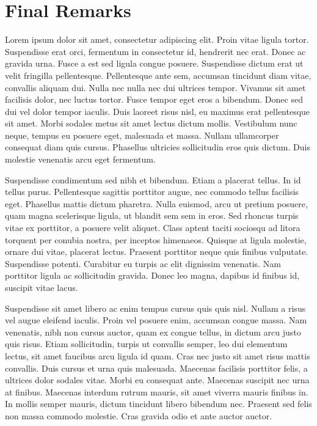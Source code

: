 
\section{Final Remarks}

 Lorem ipsum dolor sit amet, consectetur adipiscing elit. Proin vitae ligula tortor. Suspendisse erat orci, fermentum in consectetur id, hendrerit nec erat. Donec ac gravida urna. Fusce a est sed ligula congue posuere. Suspendisse dictum erat ut velit fringilla pellentesque. Pellentesque ante sem, accumsan tincidunt diam vitae, convallis aliquam dui. Nulla nec nulla nec dui ultrices tempor. Vivamus sit amet facilisis dolor, nec luctus tortor. Fusce tempor eget eros a bibendum. Donec sed dui vel dolor tempor iaculis. Duis laoreet risus nisl, eu maximus erat pellentesque sit amet. Morbi sodales metus sit amet lectus dictum mollis. Vestibulum nunc neque, tempus eu posuere eget, malesuada et massa. Nullam ullamcorper consequat diam quis cursus. Phasellus ultricies sollicitudin eros quis dictum. Duis molestie venenatis arcu eget fermentum.

Suspendisse condimentum sed nibh et bibendum. Etiam a placerat tellus. In id tellus purus. Pellentesque sagittis porttitor augue, nec commodo tellus facilisis eget. Phasellus mattis dictum pharetra. Nulla euismod, arcu ut pretium posuere, quam magna scelerisque ligula, ut blandit sem sem in eros. Sed rhoncus turpis vitae ex porttitor, a posuere velit aliquet. Class aptent taciti sociosqu ad litora torquent per conubia nostra, per inceptos himenaeos. Quisque at ligula molestie, ornare dui vitae, placerat lectus. Praesent porttitor neque quis finibus vulputate. Suspendisse potenti. Curabitur eu turpis ac elit dignissim venenatis. Nam porttitor ligula ac sollicitudin gravida. Donec leo magna, dapibus id finibus id, suscipit vitae lacus.

Suspendisse sit amet libero ac enim tempus cursus quis quis nisl. Nullam a risus vel augue eleifend iaculis. Proin vel posuere enim, accumsan congue massa. Nam venenatis, nibh non cursus auctor, quam ex congue tellus, in dictum arcu justo quis risus. Etiam sollicitudin, turpis ut convallis semper, leo dui elementum lectus, sit amet faucibus arcu ligula id quam. Cras nec justo sit amet risus mattis convallis. Duis cursus et urna quis malesuada. Maecenas facilisis porttitor felis, a ultrices dolor sodales vitae. Morbi eu consequat ante. Maecenas suscipit nec urna at finibus. Maecenas interdum rutrum mauris, sit amet viverra mauris finibus in. In mollis semper mauris, dictum tincidunt libero bibendum nec. Praesent sed felis non massa commodo molestie. Cras gravida odio et ante auctor auctor.

